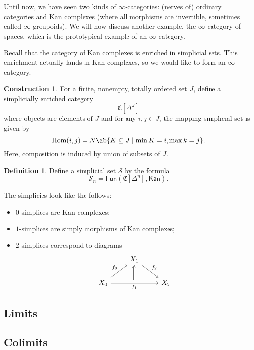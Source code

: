 \documentclass[10pt]{amsart}
\theoremstyle{definition}
\newtheorem{defn}[thm]{Definition}
\newtheorem{con}[thm]{Construction}
\theoremstyle{remark}
\theoremstyle{plain}
\theoremstyle{definition}
\theoremstyle{remark}
\newcommand{\mc}[1]{\mathcal{#1}}
\newcommand{\mf}[1]{\mathfrak{#1}}
\newcommand{\ms}[1]{\mathsf{#1}}
\newcommand{\1}{\mathbf{1}}
\newcommand{\2}{\mathbf{2}}
\newcommand{\3}{\mathbf{3}}
\DeclareMathOperator{\Hom}{Hom}
\begin{document}
Until now, we have seen two kinds of $\infty$-categories: (nerves of) ordinary categories and Kan complexes (where all morphisms are invertible, sometimes called $\infty$-groupoids). We will now discuss another example, the $\infty$-category of spaces, which is the prototypical example of an $\infty$-category.

Recall that the category of Kan complexes is enriched in simplicial sets. This enrichment actually lands in Kan complexes, so we would like to form an $\infty$-category.
\begin{con}
    For a finite, nonempty, totally ordered set $J$, define a simplicially enriched category
    \[ \mf{C}[\Delta^J] \]
    where objects are elements of $J$ and for any $i,j \in J$, the mapping simplicial set is given by
    \[ \Hom(i,j) = N \ab\{K \subseteq J \mid \min K = i, \max k = j\}. \]
    Here, composition is induced by union of subsets of $J$.
\end{con}

\begin{defn}
    Define a simplicial set $\mc{S}$ by the formula
    \[ \mc{S}_n = \ms{Fun}(\mf{C}[\Delta^n], \ms{Kan}). \]
\end{defn}

The simplicies look like the follows:
\begin{itemize}
    \item $0$-simplices are Kan complexes;
    \item $1$-simplices are simply morphisms of Kan complexes;
    \item $2$-simplices correspond to diagrams
    \begin{equation*}
    \begin{tikzcd}
        & |[alias=B]|X_1 \ar{dr}{f_2} & \\
        X_0 \ar{ur}{f_0} \arrow[rr,"f_1"{swap}, ""{name=U}] \arrow[Rightarrow, from=U, to=B] & & X_2
    \end{tikzcd}
    \end{equation*}
    
\end{itemize}

\subsection{Limits}%
\label{sub:Limits}

\subsection{Colimits}%
\label{sub:Colimits}
\end{document}
